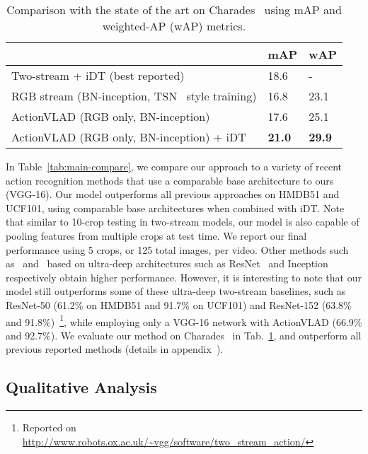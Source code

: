 \documentclass[10pt,twocolumn,letterpaper]{article}
\newcommand{\tableSize}[0]{\scriptsize}
\begin{document}
\begin{table}[]
\centering
\caption{Comparison with the state of the art
on Charades~\cite{charades}
using mAP and weighted-AP (wAP)
metrics.}
\label{tab:charades-compare}
\tableSize{}
\begin{tabular}{lll}
\toprule
                                        & mAP & wAP \\ \midrule
Two-stream + iDT (best reported)~\cite{charades} & 18.6 & - \\
RGB stream (BN-inception, TSN~\cite{WangL_16b} style training) & 16.8  & 23.1 \\
ActionVLAD (RGB only, BN-inception) & 17.6 & 25.1 \\
ActionVLAD (RGB only, BN-inception) + iDT & {\bf 21.0} & {\bf 29.9} \\
\bottomrule
\end{tabular}
\end{table}


In Table~\ref{tab:main-compare}, we compare our approach to a variety of recent action recognition methods that use a comparable base architecture to ours (VGG-16). Our model outperforms all previous approaches on HMDB51 and UCF101,
using comparable base architectures when combined with iDT.
Note that similar to 10-crop testing in two-stream models, our model
is also capable of pooling
features from multiple crops at test time.
We report our final performance using
5 crops, or 125 total images, per video.
Other methods such as~\cite{Feichtenhofer_16b}
and~\cite{WangL_16a} based on ultra-deep architectures such as ResNet~\cite{He_16} and
Inception~\cite{Ioffe_15} respectively obtain
higher performance. However, it is interesting to
note that our model still outperforms some of these ultra-deep two-stream baselines,
such as
ResNet-50 (61.2\% on HMDB51 and 91.7\% on UCF101) and
    ResNet-152 (63.8\% and 91.8\%)~\cite{Feichtenhofer_16b}\footnote{{\tiny Reported on \url{http://www.robots.ox.ac.uk/~vgg/software/two_stream_action/}}},
while employing only a VGG-16 network with ActionVLAD (66.9\% and 92.7\%).
We evaluate our method on
Charades~\cite{charades} in Tab.~\ref{tab:charades-compare},
and outperform all previous reported methods (details in appendix~\cite{appendix}).


\subsection{Qualitative Analysis}
\end{document}
